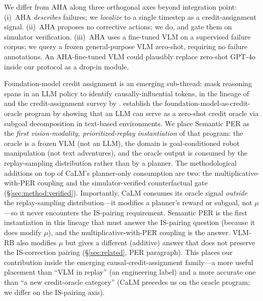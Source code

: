 \documentclass{article}
\begin{document}
We differ from AHA along three orthogonal axes beyond integration point:
(i)~AHA \emph{describes} failures; we \emph{localize} to a single timestep as
a credit-assignment signal.
(ii)~AHA proposes no corrective actions; we do, and gate them on simulator
verification.
(iii)~AHA uses a fine-tuned VLM on a supervised failure corpus; we query a
frozen general-purpose VLM zero-shot, requiring no failure annotations.
An AHA-fine-tuned VLM could plausibly replace zero-shot GPT-4o inside our
protocol as a drop-in module.

Foundation-model credit assignment is an emerging sub-thread:
\citet{khandoga2026causalcredit} mask reasoning spans in an LLM policy to
identify causally-influential tokens, in the lineage of \citet{mesnard2021cca}
and the credit-assignment survey by \citet{pignatelli2023survey}.
\citet{pignatelli2024calm} establish the foundation-model-as-credit-oracle
program by showing that an LLM can serve as a zero-shot credit oracle via
subgoal decomposition in text-based environments. We place Semantic PER as the
\emph{first vision-modality, prioritized-replay instantiation} of that
program: the oracle is a frozen VLM (not an LLM), the domain is goal-conditioned
robot manipulation (not text adventures), and the oracle output is consumed
by the replay-sampling distribution rather than by a planner. The methodological
additions on top of CaLM's planner-only consumption are two: the
multiplicative-with-PER coupling and the simulator-verified counterfactual
gate (\S\ref{sec:method:verified}). Importantly, CaLM consumes its oracle
signal \emph{outside} the replay-sampling distribution---it modifies a
planner's reward or subgoal, not $\mu$---so it never encounters the
IS-pairing requirement. Semantic PER is the first instantiation in this
lineage that must answer the IS-pairing question (because it does modify
$\mu$), and the multiplicative-with-PER coupling is the answer. VLM-RB
\citep{sharony2026vlmrb} also modifies $\mu$ but gives a different
(additive) answer that does not preserve the IS-correction pairing
(\S\ref{sec:related}, PER paragraph). This places our contribution inside
the emerging causal-credit-assignment family---a more useful placement than
``VLM in replay'' (an engineering label) and a more accurate one than ``a
new credit-oracle category'' (CaLM precedes us on the oracle program;
we differ on the IS-pairing axis).
\end{document}
